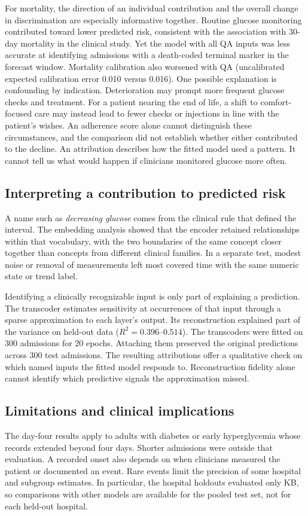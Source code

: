 For mortality, the direction of an individual contribution and the overall change in discrimination are especially informative together. Routine glucose monitoring contributed toward lower predicted risk, consistent with the association with 30-day mortality in the clinical study. Yet the model with all QA inputs was less accurate at identifying admissions with a death-coded terminal marker in the forecast window. Mortality calibration also worsened with QA (uncalibrated expected calibration error 0.010 versus 0.016). One possible explanation is confounding by indication. Deterioration may prompt more frequent glucose checks and treatment. For a patient nearing the end of life, a shift to comfort-focused care may instead lead to fewer checks or injections in line with the patient's wishes. An adherence score alone cannot distinguish these circumstances, and the comparison did not establish whether either contributed to the decline. An attribution describes how the fitted model used a pattern. It cannot tell us what would happen if clinicians monitored glucose more often.

\subsection{Interpreting a contribution to predicted risk}
A name such as \emph{decreasing glucose} comes from the clinical rule that defined the interval. The embedding analysis showed that the encoder retained relationships within that vocabulary, with the two boundaries of the same concept closer together than concepts from different clinical families. In a separate test, modest noise or removal of measurements left most covered time with the same numeric state or trend label.

Identifying a clinically recognizable input is only part of explaining a prediction. The transcoder estimates sensitivity at occurrences of that input through a sparse approximation to each layer's output. Its reconstruction explained part of the variance on held-out data ($R^2=0.396$--$0.514$). The transcoders were fitted on 300 admissions for 20 epochs. Attaching them preserved the original predictions across 300 test admissions. The resulting attributions offer a qualitative check on which named inputs the fitted model responds to. Reconstruction fidelity alone cannot identify which predictive signals the approximation missed.

\subsection{Limitations and clinical implications}
\label{sec:discussion-limits}
The day-four results apply to adults with diabetes or early hyperglycemia whose records extended beyond four days. Shorter admissions were outside that evaluation. A recorded onset also depends on when clinicians measured the patient or documented an event. Rare events limit the precision of some hospital and subgroup estimates. In particular, the hospital holdouts evaluated only KB, so comparisons with other models are available for the pooled test set, not for each held-out hospital.

